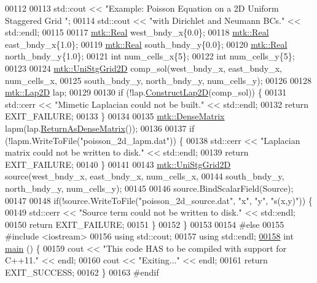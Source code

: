 \begin{DoxyCode}
00112 
00113   std::cout << \textcolor{stringliteral}{"Example: Poisson Equation on a 2D Uniform Staggered Grid "};
00114   std::cout << \textcolor{stringliteral}{"with Dirichlet and Neumann BCs."} << std::endl;
00115 
00117   \hyperlink{group__c01-roots_gac080bbbf5cbb5502c9f00405f894857d}{mtk::Real} west\_bndy\_x\{0.0\};
00118   \hyperlink{group__c01-roots_gac080bbbf5cbb5502c9f00405f894857d}{mtk::Real} east\_bndy\_x\{1.0\};
00119   \hyperlink{group__c01-roots_gac080bbbf5cbb5502c9f00405f894857d}{mtk::Real} south\_bndy\_y\{0.0\};
00120   \hyperlink{group__c01-roots_gac080bbbf5cbb5502c9f00405f894857d}{mtk::Real} north\_bndy\_y\{1.0\};
00121   \textcolor{keywordtype}{int} num\_cells\_x\{5\};
00122   \textcolor{keywordtype}{int} num\_cells\_y\{5\};
00123 
00124   \hyperlink{classmtk_1_1UniStgGrid2D}{mtk::UniStgGrid2D} comp\_sol(west\_bndy\_x, east\_bndy\_x, num\_cells\_x,
00125                              south\_bndy\_y, north\_bndy\_y, num\_cells\_y);
00126 
00128   \hyperlink{classmtk_1_1Lap2D}{mtk::Lap2D} lap;
00129 
00130   \textcolor{keywordflow}{if} (!lap.\hyperlink{classmtk_1_1Lap2D_a188ee8fee643463affca7de2884711b1}{ConstructLap2D}(comp\_sol)) \{
00131     std::cerr << \textcolor{stringliteral}{"Mimetic Laplacian could not be built."} << std::endl;
00132     \textcolor{keywordflow}{return} EXIT\_FAILURE;
00133   \}
00134 
00135   \hyperlink{classmtk_1_1DenseMatrix}{mtk::DenseMatrix} lapm(lap.\hyperlink{classmtk_1_1Lap2D_aaac0a22eaa2f036869b24fd420ce5761}{ReturnAsDenseMatrix}());
00136 
00137   \textcolor{keywordflow}{if} (!lapm.WriteToFile(\textcolor{stringliteral}{"poisson\_2d\_lapm.dat"})) \{
00138     std::cerr << \textcolor{stringliteral}{"Laplacian matrix could not be written to disk."} << std::endl;
00139     \textcolor{keywordflow}{return} EXIT\_FAILURE;
00140   \}
00141 
00143   \hyperlink{classmtk_1_1UniStgGrid2D}{mtk::UniStgGrid2D} source(west\_bndy\_x, east\_bndy\_x, num\_cells\_x,
00144                            south\_bndy\_y, north\_bndy\_y, num\_cells\_y);
00145 
00146   source.BindScalarField(Source);
00147 
00148   \textcolor{keywordflow}{if}(!source.WriteToFile(\textcolor{stringliteral}{"poisson\_2d\_source.dat"}, \textcolor{stringliteral}{"x"}, \textcolor{stringliteral}{"y"}, \textcolor{stringliteral}{"s(x,y)"})) \{
00149     std::cerr << \textcolor{stringliteral}{"Source term could not be written to disk."} << std::endl;
00150     \textcolor{keywordflow}{return} EXIT\_FAILURE;
00151   \}
00152 \}
00153 
00154 \textcolor{preprocessor}{#else}
00155 \textcolor{preprocessor}{#include <iostream>}
00156 \textcolor{keyword}{using} std::cout;
00157 \textcolor{keyword}{using} std::endl;
\hypertarget{poisson__2d_8cc_source_l00158}{}\hyperlink{poisson__2d_8cc_ae66f6b31b5ad750f1fe042a706a4e3d4}{00158} \textcolor{keywordtype}{int} \hyperlink{poisson__2d_8cc_ae66f6b31b5ad750f1fe042a706a4e3d4}{main} () \{
00159   cout << \textcolor{stringliteral}{"This code HAS to be compiled with support for C++11."} << endl;
00160   cout << \textcolor{stringliteral}{"Exiting..."} << endl;
00161   \textcolor{keywordflow}{return} EXIT\_SUCCESS;
00162 \}
00163 \textcolor{preprocessor}{#endif}
\end{DoxyCode}
